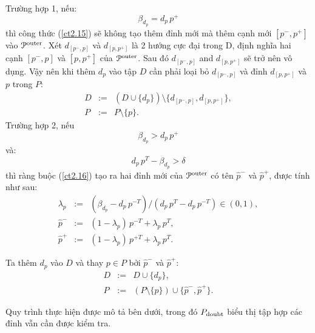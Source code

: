\documentclass[12pt,a4paper,openany,oneside]{report}
\begin{document}
Trường hợp 1, nếu:
\begin{equation}\label{ct2.17}
	\beta_{d_p} = d_p\, p^+
\end{equation}
thì công thức (\ref{ct2.15}) sẽ không tạo thêm đỉnh mới mà thêm cạnh mới  $[p^-, p^+]$ vào ${\cal P}^{\rm outer}$. Xét $d_{[p^-, p]}$ và $d_{[p, p^+]}$ là 2 hướng cực đại trong D, định nghĩa hai cạnh $[p^-, p]$ và $[ p, p^+]$ của ${\cal P}^{\rm outer}$. Sau đó $d_{[p^-, p]}$ and $d_{[p, p^+]}$ sẽ trở nên vô dụng. Vậy nên khi thêm $d_p$ vào tập $D$ cần phải loại bỏ $d_{[p^-, p]}$ và đỉnh $d_{[p, p^+]}$ và $p$ trong $P$:
\begin{equation}\label{ct2.18}
	\begin{array}{lcl}
		D &:=& (D \cup \{d_{p}\})\setminus \{d_{[p^-,p]}, d_{[p,p^+]}\}, \\
		P &:=& P \setminus \{p\}.
	\end{array}
\end{equation}
Trường hợp 2, nếu
\begin{equation}\label{ct2.19}
	\beta_{d_p} > d_p\, p^+
\end{equation}
và:
\begin{equation}\label{ct2.20}
	d_{p}\, p^T - \beta_{d_{p}} > \delta
\end{equation}
thì ràng buộc (\ref{ct2.16}) tạo ra hai đỉnh mới của ${\cal P}^{\rm outer}$ có tên $\hat p^-$ và $\hat p^+$, được tính như sau:
\begin{equation}\label{ct2.21}
	\begin{array}{lcl}
		\lambda_p &:=& (\beta_{d_p} - d_p\, p^{-T})/(d_p\, p^T - d_p\, p^{-T}) \in (0, 1), \\
		\hat p^- &:=& (1 - \lambda_p)\, p^{-T} + \lambda_p\, p^T, \\
		\hat p^+ &:=& (1 - \lambda_p)\, p^{+T} + \lambda_p\, p^T.
	\end{array}
\end{equation}

Ta thêm $d_p$ vào $D$ và thay $p \in P$ bởi $\hat p^-$ và $\hat p^+$:
\begin{equation}\label{ct2.22}
	\begin{array}{lcl}
		D &:=& D \cup \{d_{p}\}, \\
		P &:=&(P \setminus \{p\}) \cup \{\hat p^-, \hat p^+\}.
	\end{array}
\end{equation}

Quy trình thực hiện được mô tả bên dưới, trong đó $P_{\rm doubt}$ biểu thị tập hợp các đỉnh vẫn cần được kiểm tra.
\end{document}
